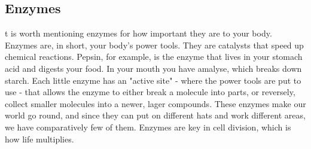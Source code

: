 \subsection{Enzymes}
t is worth mentioning enzymes for how important they are to your body.
Enzymes are, in short, your body's power tools.
They are catalysts that speed up chemical reactions.
Pepsin, for example, is the enzyme that lives in your stomach acid and digests your food.
In your mouth you have amalyse, which breaks down starch.
Each little enzyme has an "active site" - where the power tools are put to use - that allows the enzyme to either break a molecule into parts, or reversely, collect smaller molecules into a newer, lager compounds.
These enzymes make our world go round, and since they can put on different hats and work different areas, we have comparatively few of them.
Enzymes are key in cell division, which is how life multiplies. 

